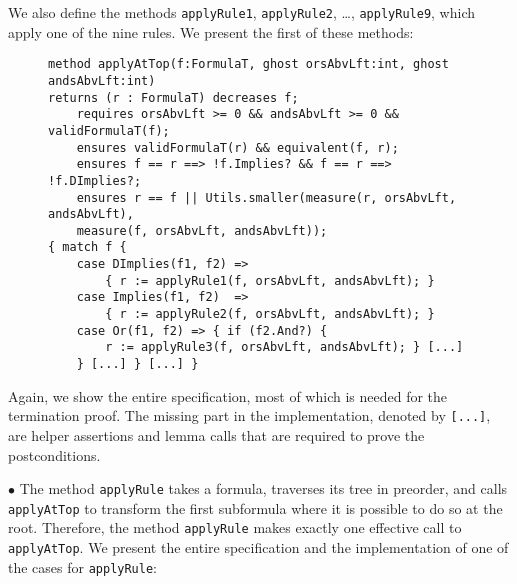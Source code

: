 We also define the methods \texttt{applyRule1}, \texttt{applyRule2},
\ldots, \texttt{applyRule9}, which apply one of the nine rules. We
present the first of these methods:

\begin{figure}[H]
\begin{Verbatim}[fontsize=\small, baselinestretch=0.1]
method applyAtTop(f:FormulaT, ghost orsAbvLft:int, ghost andsAbvLft:int)
returns (r : FormulaT) decreases f;
    requires orsAbvLft >= 0 && andsAbvLft >= 0 && validFormulaT(f);
    ensures validFormulaT(r) && equivalent(f, r);
    ensures f == r ==> !f.Implies? && f == r ==> !f.DImplies?;
    ensures r == f || Utils.smaller(measure(r, orsAbvLft, andsAbvLft),
    measure(f, orsAbvLft, andsAbvLft));
{ match f {
    case DImplies(f1, f2) => 
        { r := applyRule1(f, orsAbvLft, andsAbvLft); }
    case Implies(f1, f2)  => 
        { r := applyRule2(f, orsAbvLft, andsAbvLft); }
    case Or(f1, f2) => { if (f2.And?) {
        r := applyRule3(f, orsAbvLft, andsAbvLft); } [...]
    } [...] } [...] }
\end{Verbatim}
\end{figure}
Again, we show the entire specification, most of which is needed for
the termination proof. The missing part in the implementation, denoted
by \texttt{[...]}, are helper assertions and lemma calls that are
required to prove the postconditions.

\( \bullet \) The method \texttt{applyRule} takes a formula, traverses
its tree in preorder, and calls \texttt{applyAtTop} to transform the
first subformula where it is possible to do so at the root. Therefore,
the method \texttt{applyRule} makes exactly one effective call to
\texttt{applyAtTop}. We present the entire specification and the
implementation of one of the cases for \texttt{applyRule}:

